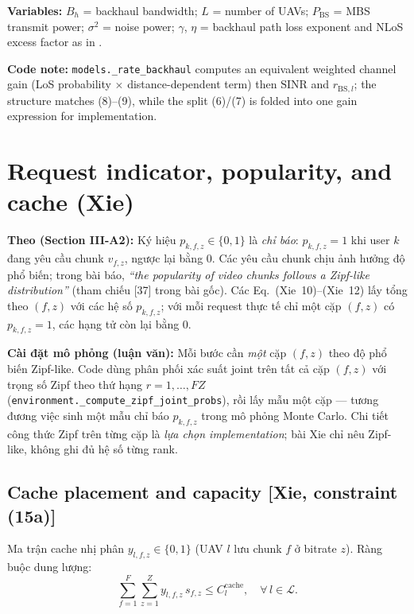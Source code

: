 \documentclass[11pt,a4paper]{article}
\begin{document}
\noindent \textbf{Variables:}
$B_h$ = backhaul bandwidth;
$L$ = number of UAVs;
$P_{\mathrm{BS}}$ = MBS transmit power;
$\sigma^2$ = noise power;
$\gamma$, $\eta$ = backhaul path loss exponent and NLoS excess factor as in \cite{Xie}.

\noindent \textbf{Code note:} \texttt{models.\_rate\_backhaul} computes an equivalent weighted channel gain
(LoS probability $\times$ distance-dependent term) then $\mathrm{SINR}$ and $r_{\mathrm{BS},l}$; the structure matches
(8)--(9), while the split (6)/(7) is folded into one gain expression for implementation.

\section{Request indicator, popularity, and cache (Xie)}

\noindent \textbf{Theo \cite{Xie} (Section III-A2):} Ký hiệu $p_{k,f,z} \in \{0,1\}$ là \emph{chỉ báo}:
$p_{k,f,z}=1$ khi user $k$ đang yêu cầu chunk $v_{f,z}$, ngược lại bằng $0$.
Các yêu cầu chunk chịu ảnh hưởng độ phổ biến; trong bài báo,
\emph{``the popularity of video chunks follows a Zipf-like distribution''} \cite{Xie}
(tham chiếu [37] trong bài gốc). Các Eq.~(Xie~10)--(Xie~12) lấy tổng theo $(f,z)$ với các hệ số
$p_{k,f,z}$; với mỗi request thực tế chỉ một cặp $(f,z)$ có $p_{k,f,z}=1$, các hạng tử còn lại bằng $0$.

\noindent \textbf{Cài đặt mô phỏng (luận văn):} Mỗi bước cần \emph{một} cặp $(f,z)$ theo độ phổ biến Zipf-like.
Code dùng phân phối xác suất joint trên tất cả cặp $(f,z)$ với trọng số Zipf theo thứ hạng
$r=1,\ldots,FZ$ (\texttt{environment.\_compute\_zipf\_joint\_probs}), rồi lấy mẫu một cặp ---
tương đương việc sinh một mẫu chỉ báo $p_{k,f,z}$ trong mô phỏng Monte Carlo.
Chi tiết công thức Zipf trên từng cặp là \emph{lựa chọn implementation}; bài Xie chỉ nêu Zipf-like, không ghi đủ hệ số từng rank.

\subsection{Cache placement and capacity [Xie, constraint (15a)]}

\noindent Ma trận cache nhị phân $y_{l,f,z} \in \{0,1\}$ (UAV $l$ lưu chunk $f$ ở bitrate $z$).
Ràng buộc dung lượng:
\begin{equation}
  \sum_{f=1}^{F}\sum_{z=1}^{Z} y_{l,f,z}\, s_{f,z} \leq C_l^{\mathrm{cache}}, \quad \forall\, l \in \mathcal{L}.
  \tag{Xie~15a}
\end{equation}
\end{document}

